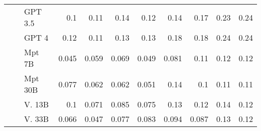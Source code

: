 \begin{table}[!htbp]
\begin{tabular}{l|l|l|rrrr|rrrr}
 &  & GPT 3.5  & {\cellcolor[HTML]{4F9BCB}} \color[HTML]{F1F1F1} 0.1 & {\cellcolor[HTML]{3E8EC4}} \color[HTML]{F1F1F1} 0.11 & {\cellcolor[HTML]{125EA6}} \color[HTML]{F1F1F1} 0.14 & {\cellcolor[HTML]{3181BD}} \color[HTML]{F1F1F1} 0.12  & {\cellcolor[HTML]{FC7F5F}} \color[HTML]{F1F1F1} 0.14 & {\cellcolor[HTML]{F96245}} \color[HTML]{F1F1F1} 0.17 & {\cellcolor[HTML]{C9181D}} \color[HTML]{F1F1F1} 0.23 & {\cellcolor[HTML]{BC141A}} \color[HTML]{F1F1F1} 0.24 \\  
 &  & GPT 4   & {\cellcolor[HTML]{2C7CBA}} \color[HTML]{F1F1F1} 0.12 & {\cellcolor[HTML]{4896C8}} \color[HTML]{F1F1F1} 0.11 & {\cellcolor[HTML]{2070B4}} \color[HTML]{F1F1F1} 0.13 & {\cellcolor[HTML]{1C6BB0}} \color[HTML]{F1F1F1} 0.13  & {\cellcolor[HTML]{F24734}} \color[HTML]{F1F1F1} 0.18 & {\cellcolor[HTML]{F44F39}} \color[HTML]{F1F1F1} 0.18 & {\cellcolor[HTML]{B81419}} \color[HTML]{F1F1F1} 0.24 & {\cellcolor[HTML]{B31218}} \color[HTML]{F1F1F1} 0.24 \\  
 &  & Mpt 7B  & {\cellcolor[HTML]{D0E1F2}} \color[HTML]{000000} 0.045 & {\cellcolor[HTML]{B5D4E9}} \color[HTML]{000000} 0.059 & {\cellcolor[HTML]{A1CBE2}} \color[HTML]{000000} 0.069 & {\cellcolor[HTML]{CADDF0}} \color[HTML]{000000} 0.049  & {\cellcolor[HTML]{FDCBB6}} \color[HTML]{000000} 0.081 & {\cellcolor[HTML]{FCA98C}} \color[HTML]{000000} 0.11 & {\cellcolor[HTML]{FCA082}} \color[HTML]{000000} 0.12 & {\cellcolor[HTML]{FC9D7F}} \color[HTML]{000000} 0.12 \\  
 &  & Mpt 30B  & {\cellcolor[HTML]{8CC0DD}} \color[HTML]{000000} 0.077 & {\cellcolor[HTML]{B0D2E7}} \color[HTML]{000000} 0.062 & {\cellcolor[HTML]{B0D2E7}} \color[HTML]{000000} 0.062 & {\cellcolor[HTML]{C7DCEF}} \color[HTML]{000000} 0.051 &  {\cellcolor[HTML]{FC8161}} \color[HTML]{F1F1F1} 0.14 & {\cellcolor[HTML]{FCAF93}} \color[HTML]{000000} 0.1 & {\cellcolor[HTML]{FCA588}} \color[HTML]{000000} 0.11 & {\cellcolor[HTML]{FCAE92}} \color[HTML]{000000} 0.11 \\  
 &  & V. 13B  & {\cellcolor[HTML]{4896C8}} \color[HTML]{F1F1F1} 0.1 & {\cellcolor[HTML]{9CC9E1}} \color[HTML]{000000} 0.071 & {\cellcolor[HTML]{77B5D9}} \color[HTML]{000000} 0.085 & {\cellcolor[HTML]{91C3DE}} \color[HTML]{000000} 0.075 &  {\cellcolor[HTML]{FC8B6B}} \color[HTML]{F1F1F1} 0.13 & {\cellcolor[HTML]{FC9879}} \color[HTML]{000000} 0.12 & {\cellcolor[HTML]{FC8262}} \color[HTML]{F1F1F1} 0.14 & {\cellcolor[HTML]{FC9C7D}} \color[HTML]{000000} 0.12 \\  
 &  & V. 33B  & {\cellcolor[HTML]{A8CEE4}} \color[HTML]{000000} 0.066 & {\cellcolor[HTML]{CCDFF1}} \color[HTML]{000000} 0.047 & {\cellcolor[HTML]{8CC0DD}} \color[HTML]{000000} 0.077 & {\cellcolor[HTML]{7CB7DA}} \color[HTML]{000000} 0.083 &   {\cellcolor[HTML]{FCBCA2}} \color[HTML]{000000} 0.094 & {\cellcolor[HTML]{FCC4AD}} \color[HTML]{000000} 0.087 & {\cellcolor[HTML]{FC8B6B}} \color[HTML]{F1F1F1} 0.13 & {\cellcolor[HTML]{FC9879}} \color[HTML]{000000} 0.12 \\  

\end{tabular}
\end{table}
